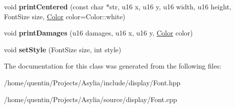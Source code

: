 \begin{DoxyCompactItemize}
\item 
\hypertarget{classFont_a3c8dcee4dd35e8e59bb0789b1ec8aee9}{void {\bfseries print\-Centered} (const char $\ast$str, u16 x, u16 y, u16 width, u16 height, Font\-Size size, \hyperlink{classColor}{Color} color=Color\-::white)}\label{classFont_a3c8dcee4dd35e8e59bb0789b1ec8aee9}

\item 
\hypertarget{classFont_a7e6e9d3b6ed94fc2d7d053a7f1d46263}{void {\bfseries print\-Damages} (u16 damages, u16 x, u16 y, \hyperlink{classColor}{Color} color)}\label{classFont_a7e6e9d3b6ed94fc2d7d053a7f1d46263}

\item 
\hypertarget{classFont_a232096091c450cbee74d35952b480861}{void {\bfseries set\-Style} (Font\-Size size, int style)}\label{classFont_a232096091c450cbee74d35952b480861}

\end{DoxyCompactItemize}


The documentation for this class was generated from the following files\-:\begin{DoxyCompactItemize}
\item 
/home/quentin/\-Projects/\-Asylia/include/display/Font.\-hpp\item 
/home/quentin/\-Projects/\-Asylia/source/display/Font.\-cpp\end{DoxyCompactItemize}
